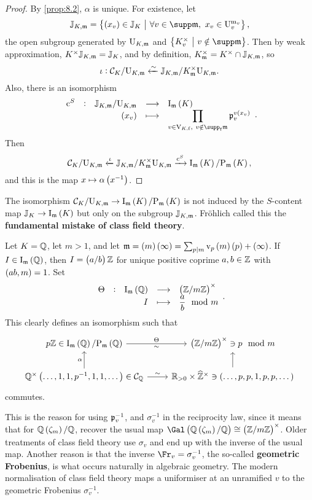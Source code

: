 \pagebreak

\begin{proof}
By \ref{prop:8.2}, $ \alpha $ is unique. For existence, let
$$ \JJ_{K, \mmm} = \cbr{\br{x_v} \in \JJ_K \st \forall v \in \supp \mmm, \ x_v \in \U_v^{\m_v}}, $$
the open subgroup generated by $ \mathrm{U}_{K, \mathfrak{m}} $ and $ \cbr{K_v^\times \st v \notin \supp \mmm} $. Then by weak approximation, $ K^\times\mathbb{J}_{K, \mathfrak{m}} = \mathbb{J}_K $, and by definition, $ K_{\mathfrak{m}}^\times = K^\times \cap \mathbb{J}_{K, \mathfrak{m}} $, so
$$ \iota : \mathcal{C}_K / \mathrm{U}_{K, \mathfrak{m}} \xleftarrow{\sim} \mathbb{J}_{K, \mathfrak{m}} / K_{\mathfrak{m}}^\times\mathrm{U}_{K, \mathfrak{m}}. $$
Also, there is an isomorphism
$$ \function[\c^S]{\JJ_{K, \mmm} / \U_{K, \mmm}}{\I_\mmm\br{K}}{\br{x_v}}{\prod_{v \in \V_{K, \f}, \ v \notin \supp_\f \mmm} \ppp_v^{v\br{x_v}}}. $$
Then
$$ \CCC_K / \U_{K, \mmm} \xleftarrow{\iota} \JJ_{K, \mmm} / K_\mmm^\times\U_{K, \mmm} \xrightarrow{\c^S} \I_\mmm\br{K} / \P_\mmm\br{K}, $$
and this is the map $ x \mapsto \alpha\br{x^{-1}} $.
\end{proof}

\begin{remark*}
The isomorphism $ \CCC_K / \U_{K, \mmm} \to \I_\mmm\br{K} / \P_\mmm\br{K} $ is not induced by the $ S $-content map $ \JJ_K \to \I_\mmm\br{K} $ but only on the subgroup $ \mathbb{J}_{K, \mathfrak{m}} $. Fr\"ohlich called this the \textbf{fundamental mistake of class field theory}.
\end{remark*}

\begin{example*}
Let $ K = \mathbb{Q} $, let $ m > 1 $, and let $ \mmm = \br{m}\br{\infty} = \sum_{p \mid m} \v_p\br{m}\br{p} + \br{\infty} $. If $ I \in \I_\mmm\br{\QQ} $, then $ I = \br{a / b}\ZZ $ for unique positive coprime $ a, b \in \mathbb{Z} $ with $ \br{ab, m} = 1 $. Set
$$ \function[\Theta]{\I_\mmm\br{\QQ}}{\br{\ZZ / m\ZZ}^\times}{I}{\dfrac{a}{b} \mod m}. $$
This clearly defines an isomorphism such that
$$
\begin{tikzcd}
p\ZZ \in \I_\mmm\br{\QQ} / \P_\mmm\br{\QQ} \arrow{r}{\Theta}[swap]{\sim} & \br{\ZZ / m\ZZ}^\times \ni p \mod m \\
\QQ^\times\br{\dots, 1, 1, p^{-1}, 1, 1, \dots} \in \CCC_\QQ \arrow{u}{\alpha} \arrow{r}{\sim} & \RR_{> 0} \times \widehat{\ZZ}^\times \arrow{u} \ni \br{\dots, p, p, 1, p, p, \dots}
\end{tikzcd}
$$
commutes.
\end{example*}

This is the reason for using $ \mathfrak{p}_v^{-1} $, and $ \sigma_v^{-1} $ in the reciprocity law, since it means that for $ \QQ\br{\zeta_m} / \QQ $, recover the usual map $ \Gal\br{\QQ\br{\zeta_m} / \QQ} \cong \br{\ZZ / m\ZZ}^\times $. Older treatments of class field theory use $ \sigma_v $ and end up with the inverse of the usual map. Another reason is that the inverse $ \Fr_v = \sigma_v^{-1} $, the so-called \textbf{geometric Frobenius}, is what occurs naturally in algebraic geometry. The modern normalisation of class field theory maps a uniformiser at an unramified $ v $ to the geometric Frobenius $ \sigma_v^{-1} $.

